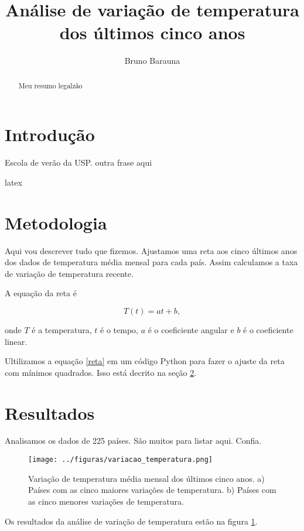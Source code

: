 \documentclass{article}
\begin{document}
\title{Análise de variação de temperatura dos últimos cinco anos}
\author{Bruno Barauna}
\maketitle

\begin{abstract}
Meu resumo legalzão
\end{abstract}

\section{Introdução}

Escola de verão da USP.
outra frase aqui

latex

\section{Metodologia}
\label{sec:metodos}
Aqui vou descrever tudo que fizemos.
Ajustamos uma reta aos cinco últimos anos dos dados
de temperatura média mensal para cada país.
Assim calculamos a taxa de variação de temperatura recente.

A equação da reta é

\begin{equation}
T(t) = a t +b,
\label{eq:reta}
\end{equation}

\noindent
onde $T$ é a temperatura, $t$ é o tempo, $a$ é o coeficiente angular e $b$ é o coeficiente linear.

Ultilizamos a equação \ref{reta} em um código Python para fazer o ajuste da 
reta com mínimos quadrados.
Isso está decrito na seção \ref{sec:metodos}.

\section{Resultados}
\label{sec:resultados}

Analisamos os dados de 225 países. São muitos para listar aqui. Confia.
\begin{figure}[!htb]
	\centering
	\texttt{[image: ../figuras/variacao\_temperatura.png]}
	\caption{
		Variação de temperatura média mensal dos últimos cinco anos.
		a) Países com as cinco maiores variações de temperatura.
		b) Países com as cinco menores variações de temperatura.
	}
	\label{fig:variacoes}
\end{figure}

Os resultados da análise de variação de temperatura estão na figura \ref{fig:variacoes}.
\end{document}
